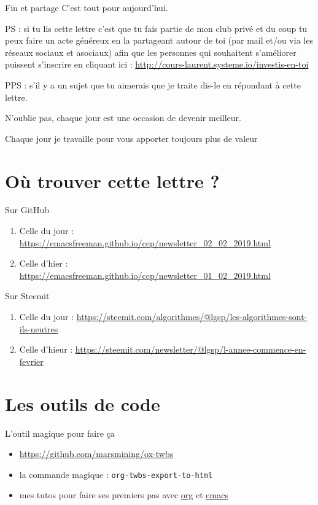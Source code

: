 \documentclass[presentation]{beamer}
\begin{document}
\begin{frame}[label={sec:org813b1c4}]{Fin et partage}
C'est tout pour aujourd'hui.


PS : si tu lis cette lettre c'est que tu fais partie de mon club
privé et du coup tu peux faire un acte généreux en la partageant
autour de toi (par mail et/ou via les réseaux sociaux et asociaux)
afin que les personnes qui souhaitent s'améliorer puissent
s'inscrire en cliquant ici :
\url{http://cours-laurent.systeme.io/investis-en-toi}

PPS : s'il y a un sujet que tu aimerais que je traite dis-le en
répondant à cette lettre.


N'oublie pas, chaque jour est une occasion de devenir meilleur.

Chaque jour je travaille pour vous apporter toujours plus de valeur
\end{frame}

\section{Où trouver cette lettre ?}
\label{sec:orgb68d777}
\begin{frame}[label={sec:orga7fb369}]{Sur GitHub}
\begin{enumerate}
\item Celle du jour :
\url{https://emacsfreeman.github.io/ccp/newsletter\_02\_02\_2019.html}

\item Celle d'hier :
\url{https://emacsfreeman.github.io/ccp/newsletter\_01\_02\_2019.html}
\end{enumerate}
\end{frame}

\begin{frame}[label={sec:orgf518f17}]{Sur Steemit}
\begin{enumerate}
\item Celle du jour :
\url{https://steemit.com/algorithmes/@lgsp/les-algorithmes-sont-ils-neutres}

\item Celle d'hieur :
\url{https://steemit.com/newsletter/@lgsp/l-annee-commence-en-fevrier}
\end{enumerate}
\end{frame}

\section{Les outils de code}
\label{sec:org29ce28c}
\begin{frame}[fragile,label={sec:orgbf2c0b7}]{L'outil magique pour faire ça}
 \begin{itemize}
\item \url{https://github.com/marsmining/ox-twbs}
\item la commande magique : \texttt{org-twbs-export-to-html}
\item mes tutos pour faire ses premiers pas avec \href{https://www.youtube.com/playlist?list=PLUJNJAesbJGWi3dXmGljFTXCPt-ntQFco}{org} et \href{https://www.youtube.com/playlist?list=PLUJNJAesbJGXZHtC\_bTUOCwB\_qkfbdHpZ}{emacs}
\end{itemize}
\end{frame}
\end{document}
